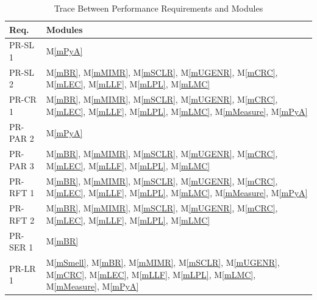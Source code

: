 \documentclass[12pt, titlepage]{article}
\newcommand{\mref}[1]{M\ref{#1}}
\begin{document}
\begin{table}[H]
  \centering
  \begin{tabular}{p{} p{}}
    \toprule \textbf{Req.} & \textbf{Modules}\\
    \midrule
    PR-SL 1 & \mref{mPyA}\\
    PR-SL 2 & \mref{mBR}, \mref{mMIMR}, \mref{mSCLR}, \mref{mUGENR}, \mref{mCRC}, \mref{mLEC}, \mref{mLLF}, \mref{mLPL}, \mref{mLMC}\\
    PR-CR 1 & \mref{mBR}, \mref{mMIMR}, \mref{mSCLR}, \mref{mUGENR}, \mref{mCRC}, \mref{mLEC}, \mref{mLLF}, \mref{mLPL}, \mref{mLMC}, \mref{mMeasure}, \mref{mPyA} \\ 
    PR-PAR 2 & \mref{mPyA}\\ 
    PR-PAR 3 & \mref{mBR}, \mref{mMIMR}, \mref{mSCLR}, \mref{mUGENR}, \mref{mCRC}, \mref{mLEC}, \mref{mLLF}, \mref{mLPL}, \mref{mLMC}\\ 
    PR-RFT 1 & \mref{mBR}, \mref{mMIMR}, \mref{mSCLR}, \mref{mUGENR}, \mref{mCRC}, \mref{mLEC}, \mref{mLLF}, \mref{mLPL}, \mref{mLMC}, \mref{mMeasure}, \mref{mPyA}\\ 
    PR-RFT 2 & \mref{mBR}, \mref{mMIMR}, \mref{mSCLR}, \mref{mUGENR}, \mref{mCRC}, \mref{mLEC}, \mref{mLLF}, \mref{mLPL}, \mref{mLMC}\\
    PR-SER 1 & \mref{mBR}\\ 
    PR-LR 1 & \mref{mSmell}, \mref{mBR}, \mref{mMIMR}, \mref{mSCLR}, \mref{mUGENR}, \mref{mCRC}, \mref{mLEC}, \mref{mLLF}, \mref{mLPL}, \mref{mLMC}, \mref{mMeasure}, \mref{mPyA}\\
    \bottomrule
  \end{tabular}
  \caption{Trace Between Performance Requirements and Modules}
  \label{tab:PR-mod}
\end{table}
\end{document}
